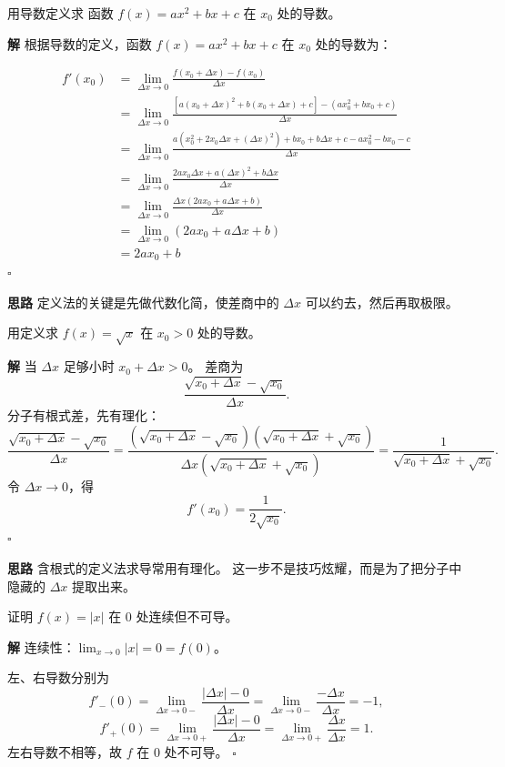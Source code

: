 \documentclass[fontset=fandol]{ctexart}
\newenvironment{solution}{\par\noindent\textbf{解}\quad}{\hfill$\square$\par\vspace{0.8em}}
\newenvironment{idea}{\par\noindent\textbf{思路}\quad}{\par\vspace{0.4em}}
\begin{document}
\begin{example}[用定义求导]
用导数定义求 函数 $f(x) = ax^2 + bx + c$ 在 $x_0$ 处的导数。
\end{example}
\begin{solution}
根据导数的定义，函数 $f(x) = ax^2 + bx + c$ 在 $x_0$ 处的导数为：

\begin{align*}
	f'(x_0) &= \lim_{\Delta x \to 0} \frac{f(x_0 + \Delta x) - f(x_0)}{\Delta x} \\
	&= \lim_{\Delta x \to 0} \frac{[a(x_0 + \Delta x)^2 + b(x_0 + \Delta x) + c] - (ax_0^2 + bx_0 + c)}{\Delta x} \\
	&= \lim_{\Delta x \to 0} \frac{a(x_0^2 + 2x_0\Delta x + (\Delta x)^2) + bx_0 + b\Delta x + c - ax_0^2 - bx_0 - c}{\Delta x} \\
	&= \lim_{\Delta x \to 0} \frac{2ax_0\Delta x + a(\Delta x)^2 + b\Delta x}{\Delta x} \\
	&= \lim_{\Delta x \to 0} \frac{\Delta x(2ax_0 + a\Delta x + b)}{\Delta x} \\
	&= \lim_{\Delta x \to 0} (2ax_0 + a\Delta x + b) \\
	&= 2ax_0 + b
\end{align*}
\end{solution}
\begin{idea}
定义法的关键是先做代数化简，使差商中的 $\Delta x$ 可以约去，然后再取极限。
\end{idea}

\begin{example}[用定义求根式函数的导数]
用定义求 $f(x)=\sqrt{x}$ 在 $x_0>0$ 处的导数。
\end{example}
\begin{solution}
当 $\Delta x$ 足够小时 $x_0+\Delta x>0$。 差商为
\[
\frac{\sqrt{x_0+\Delta x}-\sqrt{x_0}}{\Delta x}.
\]
分子有根式差，先有理化：
\[
\frac{\sqrt{x_0+\Delta x}-\sqrt{x_0}}{\Delta x}
=\frac{(\sqrt{x_0+\Delta x}-\sqrt{x_0})(\sqrt{x_0+\Delta x}+\sqrt{x_0})}{\Delta x(\sqrt{x_0+\Delta x}+\sqrt{x_0})}
=\frac1{\sqrt{x_0+\Delta x}+\sqrt{x_0}}.
\]
令 $\Delta x\to0$，得
\[
f'(x_0)=\frac1{2\sqrt{x_0}}.
\]
\end{solution}
\begin{idea}
含根式的定义法求导常用有理化。 这一步不是技巧炫耀，而是为了把分子中隐藏的 $\Delta x$ 提取出来。
\end{idea}

\begin{example}[连续但不可导]
证明 $f(x)=|x|$ 在 $0$ 处连续但不可导。
\end{example}
\begin{solution}
连续性：$\lim_{x\to0}|x|=0=f(0)$。

左、右导数分别为
\[
f'_-(0)=\lim_{\Delta x\to0-}\frac{|\Delta x|-0}{\Delta x}
=\lim_{\Delta x\to0-}\frac{-\Delta x}{\Delta x}=-1,
\]
\[
f'_+(0)=\lim_{\Delta x\to0+}\frac{|\Delta x|-0}{\Delta x}
=\lim_{\Delta x\to0+}\frac{\Delta x}{\Delta x}=1.
\]
左右导数不相等，故 $f$ 在 $0$ 处不可导。
\end{solution}
\end{document}
